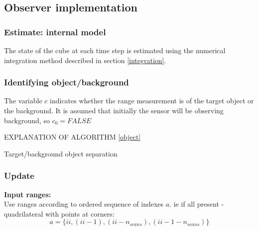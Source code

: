 	
\subsection{Observer implementation}
	\subsubsection{Estimate: internal model}
		The state of the cube at each time step is estimated using the numerical integration method described in section \ref{integration}.
	
	\subsubsection{Identifying object/background}
		The variable $c$ indicates whether the range measurement is of the target object or the background. It is assumed that initially the sensor will be observing background, so $c_0 = FALSE$

		EXPLANATION OF ALGORITHM \ref{object}
		
		\IncMargin{2em}
		\begin{algorithm}
		\DontPrintSemicolon
	
		\caption{Target/background object separation} \label{object}
		\end{algorithm}
		
	\subsubsection{Update}
		\textbf{Input ranges:}\\
			Use ranges according to ordered sequence of indexes $a$. ie if all present - quadrilateral with points at corners:
			\begin{equation}
				a = \{ii,(ii-1),(ii-n_{scans}),(ii-1-n_{scans})\}
			\end{equation}
		
